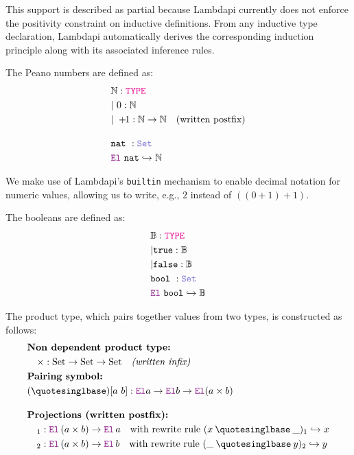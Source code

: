 This support is described as partial because Lambdapi currently does not enforce the positivity constraint on inductive definitions.
From any inductive type declaration, Lambdapi automatically derives the corresponding induction principle along with its associated inference rules.


\begin{definition}[Natural]\label{def-nat}
The Peano numbers are defined as:
\begin{align*}
&\N: \type \\
&|~0 : \N \\
&|~+\!\!1: \N \ra \N \quad \text{(written postfix)} \\[1em]
& \kw{nat}~: \set \\
&  \el~\kw{nat} \re \N
\end{align*}
\end{definition}

We make use of Lambdapi's \lstinline[language=Lambdapi,basicstyle=\ttfamily\footnotesize]|builtin| mechanism to enable decimal notation for numeric values, allowing us to write, e.g., $2$ instead of $((0 +\!\!1) +\!\!1)$.

\begin{definition}[Boolean]\label{def-bool}
The booleans are defined as:
\begin{align*}
&\B: \type \\
&| \true : \B \\
&| \false : \B \\
& \kw{bool}~: \set \\
&  \el~\kw{bool} \re \B
\end{align*}
\end{definition}

\begin{definition}\label{def-product}
The product type, which pairs together values from two types, is constructed as follows:
\begin{align*}
&\textbf{Non dependent product type:} \\
&\quad \times : \text{Set} \to \text{Set} \to \text{Set} \quad \textit{(written infix)} \\
&\textbf{Pairing symbol:} \\
&(\mathbin{‚}) [a~b] : \el a \ra \el b \ra \el (a \times b)\\[1em]
&\textbf{Projections (written postfix):}  \\
&\quad {}_1 : \el\, (a \times b) \ra \el\, a \quad \text{with rewrite rule } (x \mathbin{‚} \_)_1 \re x \\
&\quad {}_2 : \el\, (a \times b) \ra \el\, b \quad \text{with rewrite rule } (\_ \mathbin{‚} y)_2 \re y
\end{align*}
\end{definition}

